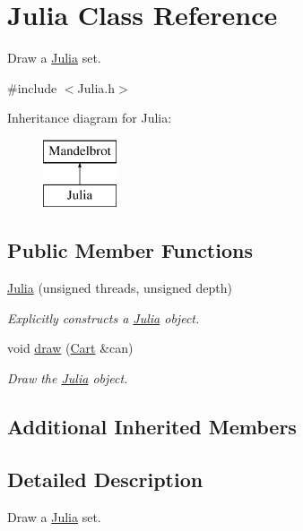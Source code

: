 \hypertarget{class_julia}{}\section{Julia Class Reference}
\label{class_julia}


Draw a \hyperlink{class_julia}{Julia} set.  




{\ttfamily \#include $<$Julia.\+h$>$}

Inheritance diagram for Julia\+:\begin{figure}[H]
\begin{center}
\leavevmode
\includegraphics[height=2.000000cm]{class_julia}
\end{center}
\end{figure}
\subsection*{Public Member Functions}
\begin{DoxyCompactItemize}
\item 
\hyperlink{class_julia_a8bc853f8129d8f2503bbda1236f64b36}{Julia} (unsigned threads, unsigned depth)
\begin{DoxyCompactList}\small\item\em Explicitly constructs a \hyperlink{class_julia}{Julia} object. \end{DoxyCompactList}\item 
void \hyperlink{class_julia_ab877233424159ca87da6dcf0f0f36e51}{draw} (\hyperlink{classtsgl_1_1_cartesian_canvas}{Cart} \&can)
\begin{DoxyCompactList}\small\item\em Draw the \hyperlink{class_julia}{Julia} object. \end{DoxyCompactList}\end{DoxyCompactItemize}
\subsection*{Additional Inherited Members}


\subsection{Detailed Description}
Draw a \hyperlink{class_julia}{Julia} set. 

